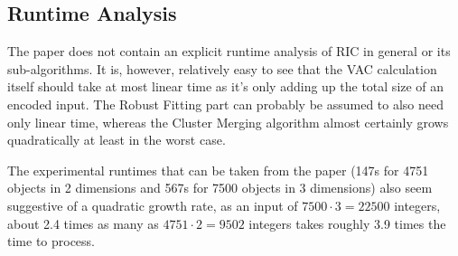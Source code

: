 \documentclass[conference]{IEEEtran}
\begin{document}
\subsection{Runtime Analysis}
\label{sub:run}
The paper does not contain an explicit runtime analysis of RIC in general or its sub-algorithms. It is, however, relatively easy to see that the VAC calculation itself should take at most linear time as it's only adding up the total size of an encoded input. The Robust Fitting part can probably be assumed to also need only linear time, whereas the Cluster Merging algorithm almost certainly grows quadratically at least in the worst case.

The experimental runtimes that can be taken from the paper (147s for 4751 objects in 2 dimensions and 567s for 7500 objects in 3 dimensions) also seem suggestive of a quadratic growth rate, as an input of $ 7500 \cdot 3 = 22500 $ integers, about 2.4 times as many as $ 4751 \cdot 2 = 9502 $ integers takes roughly 3.9 times the time to process.
\end{document}
